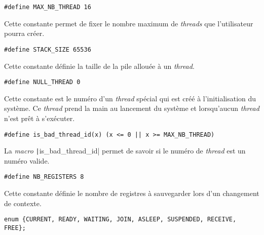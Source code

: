 \documentclass[a4paper]{article}
\begin{document}
\begin{verbatim}
#define MAX_NB_THREAD 16
\end{verbatim}

Cette constante permet de fixer le nombre maximum de \emph{threads} que l'utilisateur pourra créer.

\begin{verbatim}
#define STACK_SIZE 65536
\end{verbatim}

Cette constante définie la taille de la pile allouée à un \emph{thread}.

\begin{verbatim}
#define NULL_THREAD 0
\end{verbatim}

Cette constante est le numéro d'un \emph{thread} spécial qui est créé à l'initialisation du système. Ce \emph{thread} prend la main au lancement
du système et lorsqu'aucun \emph{thread} n'est prêt à s'exécuter.

\begin{verbatim}
#define is_bad_thread_id(x) (x <= 0 || x >= MAX_NB_THREAD)
\end{verbatim}

La \emph{macro} \texttt|is_bad_thread_id| permet de savoir si le numéro de \emph{thread} est un numéro valide. 

\begin{verbatim}
#define NB_REGISTERS 8
\end{verbatim}

Cette constante définie le nombre de registres à sauvegarder lors d'un changement de contexte.

\begin{verbatim}
enum {CURRENT, READY, WAITING, JOIN, ASLEEP, SUSPENDED, RECEIVE, FREE};
\end{verbatim}
\end{document}
